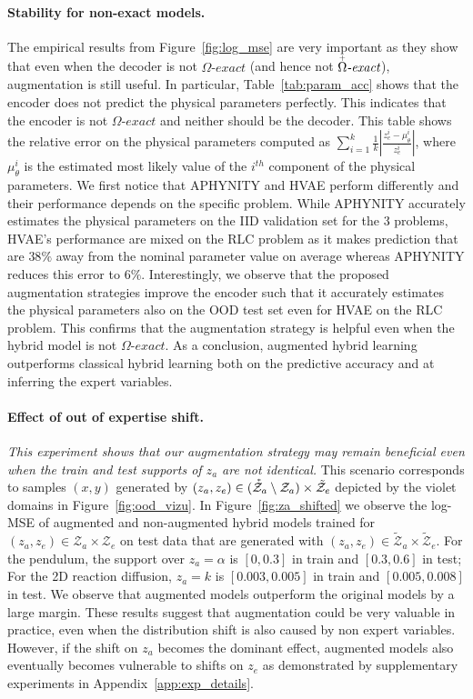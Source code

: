 \documentclass{article}
\newcommand\figref{Figure~\ref}
\newcommand\Cref{Table~\ref}
\newcommand\appref{Appendix~\ref}
\begin{document}
\paragraph{Stability for non-exact models.}
The empirical results from \figref{fig:log_mse} are very important as they show that even when the decoder is not $\Omega\textit{-exact}$ (and hence not $\accentset{+}{\Omega}\textit{-exact}$), augmentation is still useful. In particular, \Cref{tab:param_acc} shows that the encoder does not predict the physical parameters perfectly. This indicates that the encoder is not $\Omega\textit{-exact}$ and neither should be the decoder. This table shows the relative error on the physical parameters computed as $\sum_{i=1}^k\frac{1}{k}\left|\frac{z_e^i - \mu_\theta^i}{z_e^i}\right|$, where $\mu_\theta^i$ is the estimated most likely value of the $i^{th}$ component of the physical parameters. We first notice that APHYNITY and HVAE perform differently and their performance depends on the specific problem. While APHYNITY accurately estimates the physical parameters on the IID validation set for the 3 problems, HVAE's performance are mixed on the RLC problem as it makes prediction that are $38\%$ away from the nominal parameter value on average whereas APHYNITY reduces this error to $6\%$. Interestingly, we observe that the proposed augmentation strategies improve the encoder such that it accurately estimates the physical parameters also on the OOD test set even for HVAE on the RLC problem. This confirms that the augmentation strategy is helpful even when the hybrid model is not $\Omega\textit{-exact}$. As a conclusion, augmented hybrid learning outperforms classical hybrid learning both on the predictive accuracy and at inferring the expert variables.

\paragraph{Effect of out of expertise shift.}
\textit{This experiment shows that our augmentation strategy may remain beneficial even when the train and test supports of $z_a$ are not identical.} This scenario corresponds to samples $(x, y)$ generated by $(z_a, z_e) \in (\accentset{\ast}{\mathcal{Z}}_a \setminus \mathcal{Z}_a) \times \tilde{\mathcal{Z}}_e$ depicted by the violet domains in \figref{fig:ood_vizu}. In \figref{fig:za_shifted} we observe the log-MSE of augmented and non-augmented hybrid models trained for $(z_a, z_e) \in \mathcal{Z}_a \times \mathcal{Z}_e$ on test data that are generated with $(z_a, z_e) \in \tilde{\mathcal{Z}}_a \times \tilde{\mathcal{Z}}_e$. For the pendulum, the support over $z_a=\alpha$ is $\left[0, 0.3\right]$ in train and $\left[0.3, 0.6\right]$ in test; For the 2D reaction diffusion, $z_a=k$ is $\left[0.003, 0.005\right]$ in train and $\left[0.005, 0.008\right]$ in test. We observe that augmented models outperform the original models by a large margin. These results suggest that augmentation could be very valuable in practice, even when the distribution shift is also caused by non expert variables. However, if the shift on $z_a$ becomes the dominant effect, augmented models also eventually becomes vulnerable to shifts on $z_e$ as demonstrated by supplementary experiments in \appref{app:exp_details}.  
\end{document}
